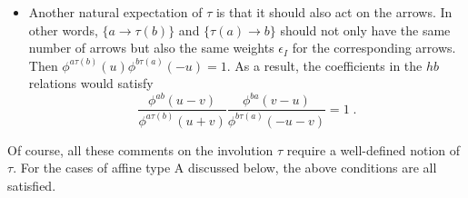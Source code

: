 \documentclass[11pt]{article}
\numberwithin{equation}{section}
\numberwithin{figure}{section}
\numberwithin{table}{section}
\begin{document}
\begin{itemize}
	\item Another natural expectation of $\tau$ is that it should also act on the arrows. In other words, $\{a\rightarrow\tau(b)\}$ and $\{\tau(a)\rightarrow b\}$ should not only have the same number of arrows but also the same weights $\epsilon_I$ for the corresponding arrows. Then $\phi^{a\tau(b)}(u)\phi^{b\tau(a)}(-u)=1$. As a result, the coefficients in the $hb$ relations would satisfy
	\begin{equation}
		\frac{\phi^{ab}(u-v)}{\phi^{a\tau(b)}(u+v)}\frac{\phi^{ba}(v-u)}{\phi^{b\tau(a)}(-u-v)}=1\;.
	\end{equation}
\end{itemize}
Of course, all these comments on the involution $\tau$ require a well-defined notion of $\tau$. For the cases of affine type A discussed below, the above conditions are all satisfied.
\end{document}
